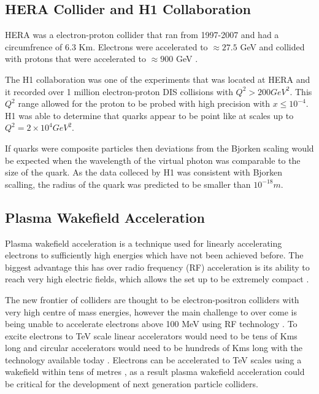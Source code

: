 \documentclass[journal, a4paper,11pt]{IEEEtran}
\begin{document}
\subsection*{\textbf{HERA Collider and H1 Collaboration}}

HERA was a electron-proton collider that ran from 1997-2007 and had a circumfrence of 6.3 Km. Electrons were accelerated to $\approx 27.5$ GeV and collided with protons that were accelerated to $\approx 900$ GeV \cite{Modern}.

The H1 collaboration \cite{H1} was one of the experiments that was located at HERA and it recorded over 1 million electron-proton DIS collisions with $Q^2 > 200 GeV^2$. This $Q^2$ range allowed for the proton to be probed with high precision with $x \leq 10^{-4}$. H1 was able to determine that quarks appear to be point like at scales up to $Q^2 = 2 \times 10^4 GeV^2$. 

If quarks were composite particles then deviations from the Bjorken scaling would be expected when the wavelength of the virtual photon was comparable to the size of the quark. As the data colleced by H1 was consistent with Bjorken scalling, the radius of the quark was predicted to be smaller than $10^{-18}m$.

\subsection*{\textbf{Plasma Wakefield Acceleration}}

Plasma wakefield acceleration is a technique used for linearly accelerating electrons to sufficiently high energies which have not been achieved before. The biggest advantage this has over radio frequency (RF) acceleration is its ability to reach very high electric fields, which allows the set up to be extremely compact \cite{0409}. 

The new frontier of colliders are thought to be electron-positron colliders with very high centre of mass energies, however the main challenge to over come is being unable to accelerate electrons above 100 MeV using RF technology \cite{0114}. To excite electrons to TeV scale linear accelerators would need to be tens of Kms long and circular accelerators would need to be hundreds of Kms long with the technology available today \cite{0114}. Electrons can be accelerated to TeV scales using a wakefield within tens of metres \cite{0409}, as a result plasma wakefield acceleration could be critical for the development of next generation particle colliders.
\end{document}
